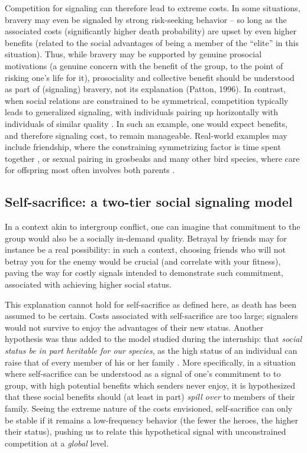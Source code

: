 \documentclass[a4paper,12pt]{report}
\begin{document}
Competition for signaling can therefore lead to extreme costs. In some situations,
bravery may even be signaled by strong risk-seeking behavior – so long as the associated costs (significantly higher death probability) are upset by even higher benefits (related to the social advantages of being a member of the “elite” in this situation). Thus, while bravery may be supported by genuine prosocial motivations (a genuine concern with the benefit of the group, to the point of risking one’s life for it), prosociality and collective benefit should be understood as part of (signaling) bravery, not its explanation (Patton, 1996).
In contrast, when social relations are constrained to be symmetrical,
competition typically leads to generalized signaling, with individuals pairing
up horizontally with individuals of similar quality \cite{chade_sorting_2017}.
In such an example, one would expect benefits, and therefore signaling cost,
to remain manageable. Real-world examples may include friendship, where the
constraining symmetrizing factor is time spent together \cite{dessalles_optimal_2014},
or sexual pairing in grosbeaks and many other bird species, where care for
offspring most often involves both parents \cite{cockburn_prevalence_2006}.

\subsection{Self-sacrifice: a two-tier social signaling model}
In a context akin to intergroup conflict, one can imagine that commitment to the group
would also be a socially in-demand quality. Betrayal by friends may for instance be a
real possibility: in such a context, choosing friends who will not betray you for the
enemy would be crucial (and correlate with your fitness), paving the way for costly signals
 intended to demonstrate such commitment, associated with achieving higher social status.

This explanation cannot hold for self-sacrifice as defined here, as death has been assumed
to be certain. Costs associated with self-sacrifice are too large; signalers would not
survive to enjoy the advantages of their new status.
Another hypothesis was thus added to the model studied during the internship:
that \emph{social status be in part heritable for our species},
as the high status of an individual can raise that of every member of his or her family
\cite{service_primitive_1962}.  More specifically, in a situation where self-sacrifice can be
understood as a signal of one’s commitment to to group,
with high potential benefits which senders never enjoy,
it is hypothesized that these social benefits should (at least in part)
\emph{spill over} to members of their family.
Seeing the extreme nature of the costs envisioned,
self-sacrifice can only be stable if it remains a low-frequency behavior
(the fewer the heroes, the higher their status), pushing us to relate this
hypothetical signal with unconstrained competition at a \emph{global} level.
\end{document}
